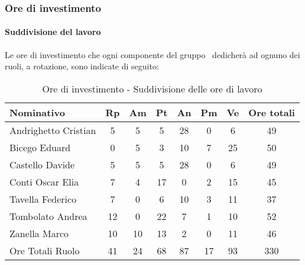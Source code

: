 \documentclass[../PianoProgetto.tex]{subfiles}
\begin{document}
	\subsubsection{Ore di investimento}
				\paragraph{Suddivisione del lavoro}
					Le ore di investimento che ogni componente del gruppo \leaf\ dedicherà ad ognuno dei ruoli, a rotazione, sono indicate di seguito:
	
					\begin{table}[h]
		\centering
	
		\begin{tabular}{l * {7}{c}}
			\toprule
			Nominativo & Rp & Am & Pt & An & Pm & Ve & Ore totali \\
			\midrule
			Andrighetto Cristian & 5 & 5 & 5 & 28 &	0 &	6 &	49 \\
			\midrule
			Bicego Eduard & 0 & 5 & 3 & 10 & 7 & 25 & 50 \\
			\midrule
			Castello Davide & 5 & 5 & 5 & 28 & 0 & 6 & 49 \\
			\midrule
			Conti Oscar Elia & 7 & 4 & 17 & 0 & 2 & 15 & 45 \\
			\midrule
			Tavella Federico &	7 & 0 & 6 & 10 & 3 & 11 & 37 \\
			\midrule
			Tombolato Andrea & 12 & 0 & 22 & 7 & 1 & 10 & 52 \\
			\midrule
			Zanella Marco & 10 & 10 & 13 & 2 & 0 & 11 & 46 \\
			\midrule			
			Ore Totali Ruolo & 41 & 24 & 68 & 87 & 17 & 93 & 330 \\
			\bottomrule
			
		\end{tabular}
		
		\caption{Ore di investimento - Suddivisione delle ore di lavoro}
		\label{tab:investimento_ore}
		
	\end{table}
	
	
\end{document}
